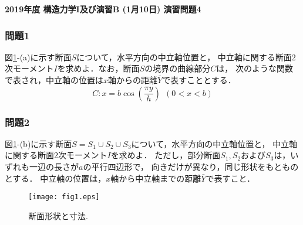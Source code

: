 \documentclass[10pt,a4j]{jarticle}
\newlength{\minitwocolumn}
\begin{document}
\newcommand{\fat}[1]{\mbox{\boldmath $#1$}}
\newcommand{\D}{\partial}
\newcommand{\w}{\omega}
\newcommand{\ga}{\alpha}
\newcommand{\gb}{\beta}
\newcommand{\gx}{\xi}
\newcommand{\gz}{\zeta}
\newcommand{\vhat}[1]{\hat{\fat{#1}}}
\newcommand{\spc}{\vspace{0.7\baselineskip}}
\newcommand{\halfspc}{\vspace{0.3\baselineskip}}

\pagestyle{empty}
\newcommand{\twofig}[2]
 {
   \begin{figure}[h]
     \begin{minipage}[t]{\minitwocolumn}
         \begin{center}   #1
         \end{center}
     \end{minipage}
         \hspace{\columnsep}
     \begin{minipage}[t]{\minitwocolumn}
         \begin{center} #2
         \end{center}
     \end{minipage}
   \end{figure}
 }
\begin{center}
{\Large \bf 2019年度 構造力学I及び演習B (1月10日) 演習問題4} \\
\end{center}
\subsubsection*{問題1}
図\ref{fig:fig1}-(a)に示す断面$S$について，水平方向の中立軸位置と，
中立軸に関する断面2次モーメント$I$を求めよ．なお，断面$S$の境界の曲線部分$C$は，
次のような関数で表され，中立軸の位置は$x$軸からの距離$\bar{Y}$で表すこととする．
\begin{equation}
	C: x=b \cos \left( \frac{\pi y}{h}\right) 
	\ \ \left(0 < x < b \right)
\end{equation}
\subsubsection*{問題2}
図\ref{fig:fig1}-(b)に示す断面$S=S_1\cup S_2 \cup S_3$について，水平方向の中立軸位置と，
中立軸に関する断面2次モーメント$I$を求めよ．
ただし，部分断面$S_1,S_2$および$S_3$は，いずれも一辺の長さが$a$の平行四辺形で，
向きだけが異なり，同じ形状をもとものとする．
中立軸の位置は，$x$軸から中立軸までの距離$\bar{Y}$で表すこと．

\vspace{15mm}
\begin{figure}[h]
	\begin{center}
	\texttt{[image: fig1.eps]} 
	\end{center}
	\caption{断面形状と寸法.} 
	\label{fig:fig1}
\end{figure}
\end{document}
